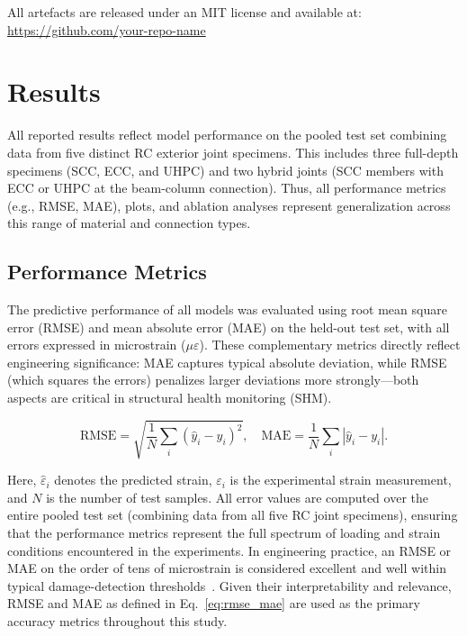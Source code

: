 \documentclass{article}
\begin{document}
All artefacts are released under an MIT license and available at:
\url{https://github.com/your-repo-name}




\section{Results}
\label{sec:results}

All reported results reflect model performance on the pooled test set combining data from five distinct RC exterior joint specimens. This includes three full-depth specimens (SCC, ECC, and UHPC) and two hybrid joints (SCC members with ECC or UHPC at the beam-column connection). Thus, all performance metrics (e.g., RMSE, MAE), plots, and ablation analyses represent generalization across this range of material and connection types.

\subsection{Performance Metrics}

The predictive performance of all models was evaluated using root mean square error (RMSE) and mean absolute error (MAE) on the held-out test set, with all errors expressed in microstrain ($\mu\varepsilon$). These complementary metrics directly reflect engineering significance: MAE captures typical absolute deviation, while RMSE (which squares the errors) penalizes larger deviations more strongly—both aspects are critical in structural health monitoring (SHM).

\begin{equation}
  \text{RMSE} = \sqrt{\frac{1}{N}\sum_i (\hat{y}_i - y_i)^2}, \quad
  \text{MAE} = \frac{1}{N}\sum_i |\hat{y}_i - y_i|.
\label{eq:rmse_mae}
\end{equation}

Here, $\hat{\varepsilon}_i$ denotes the predicted strain, $\varepsilon_i$ is the experimental strain measurement, and $N$ is the number of test samples. All error values are computed over the entire pooled test set (combining data from all five RC joint specimens), ensuring that the performance metrics represent the full spectrum of loading and strain conditions encountered in the experiments. In engineering practice, an RMSE or MAE on the order of tens of microstrain is considered excellent and well within typical damage-detection thresholds~\cite{xu2023compressive, hosseinzadeh2024durability}. Given their interpretability and relevance, RMSE and MAE as defined in Eq.~\eqref{eq:rmse_mae} are used as the primary accuracy metrics throughout this study.
\end{document}

